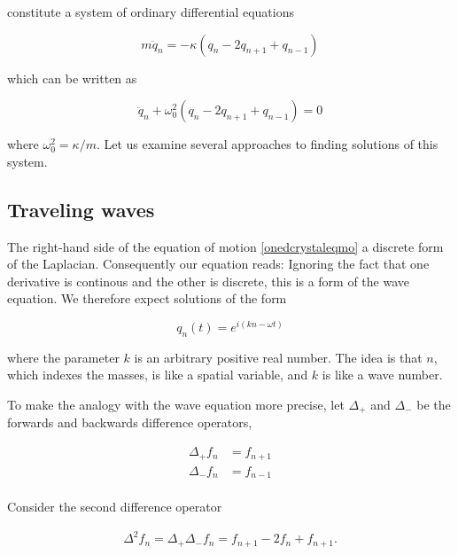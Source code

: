 constitute a system of ordinary differential equations

\begin{equation}
m\ddot q_n = - \kappa(q_n - 2q_{n+1}+ q_{n-1})
\end{equation}

which can be written as

\begin{equation}
\label{onedcrystaleqmo}
\ddot q_n + \omega_0^2(q_n - 2q_{n+1}+ q_{n-1}) = 0
\end{equation}

where $\omega_0^2 = \kappa/m$.
Let us examine several approaches to finding solutions of this system.
 




\subsection{Traveling waves}

The right-hand side of the equation of motion \eqref{onedcrystaleqmo} a discrete form of the Laplacian.  Consequently our equation reads:  Ignoring the fact that one derivative is continous and the other is discrete, this is a form of the wave equation.  We therefore expect solutions of the form

\begin{equation}
\label{crystaltravelingwaves}
q_n(t) = e^{i(kn - \omega t)}
\end{equation}

where the parameter $k$ is an arbitrary positive real number.
The idea is that $n$, which indexes the masses, is like a spatial variable, and $k$ is like a wave number.

To make the analogy with the wave equation more precise, let $\Delta_+$ and $\Delta_-$ be the forwards  and backwards difference operators,

\begin{align}
  \Delta_+ f_n & = f_{n+1} \\
  \Delta_- f_n & = f_{n-1} \\
\end{align}

Consider the second difference operator

\begin{align}
  \Delta^2 f_n = \Delta_+\Delta_- f_n  = f_{n+1}  - 2f_n + f_{n+1}.
\end{align}

